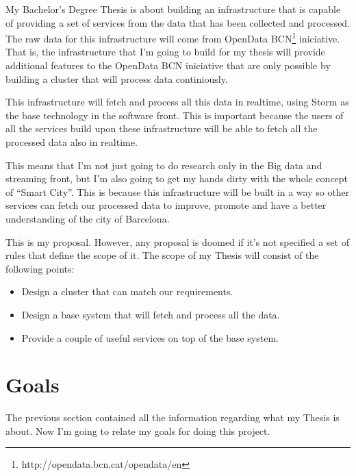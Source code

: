 \documentclass[a4paper,12pt]{article}
\newcommand{\mylist}{
\begin{itemize}
\setlength{\itemsep}{1pt}
\setlength{\parskip}{0pt}
\setlength{\parsep}{0pt}}
\newcommand{\mylistend}{\end{itemize}}
\begin{document}
My Bachelor's Degree Thesis is about building an infrastructure that is capable
of providing a set of services from the data that has been collected and
processed. The raw data for this infrastructure will come from OpenData
BCN\footnote{http://opendata.bcn.cat/opendata/en} iniciative. That is, the
infrastructure that I'm going to build for my thesis will provide additional
features to the OpenData BCN iniciative that are only possible by building a
cluster that will process data continiously.

This infrastructure will fetch and process all this data in realtime, using
Storm as the base technology in the software front. This is important because
the users of all the services build upon these infrastructure will be able to
fetch all the processed data also in realtime.

This means that I'm not just going to do research only in the Big data and
streaming front, but I'm also going to get my hands dirty with the whole concept
of ``Smart City''. This is because this infrastructure will be built in a way
so other services can fetch our processed data to improve, promote and have a
better understanding of the city of Barcelona.

This is my proposal. However, any proposal is doomed if it's not specified a set
of rules that define the scope of it. The scope of my Thesis will consist of
the following points:

\mylist
  \item Design a cluster that can match our requirements.
  \item Design a base system that will fetch and process all the data.
  \item Provide a couple of useful services on top of the base system.
\mylistend

\section*{Goals}

The previous section contained all the information regarding what my Thesis is
about. Now I'm going to relate my goals for doing this project.
\end{document}
